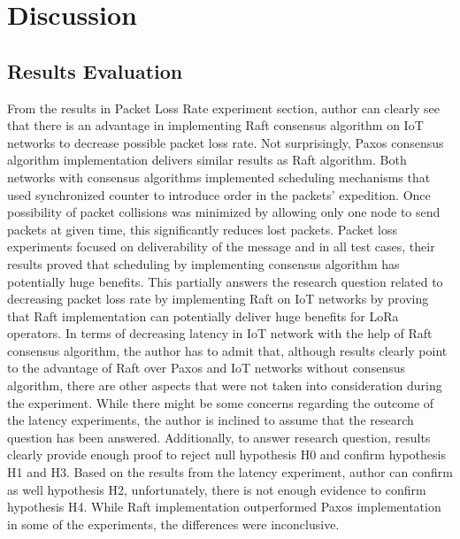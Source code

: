 \documentclass[oneside,12pt]{book}
\begin{document}
\section{Discussion}
\subsection{Results Evaluation}
From the results in Packet Loss Rate experiment section, author can clearly see that there is an advantage in implementing Raft consensus algorithm on IoT networks to decrease possible packet loss rate. Not surprisingly, Paxos consensus algorithm implementation delivers similar results as Raft algorithm. Both networks with consensus algorithms implemented scheduling mechanisms that used synchronized counter to introduce order in the packets’ expedition. Once possibility of packet collisions was minimized by allowing only one node to send packets at given time, this significantly reduces lost packets. Packet loss experiments focused on deliverability of the message and in all test cases, their results proved that scheduling by implementing consensus algorithm has potentially huge benefits. This partially answers the research question related to decreasing packet loss rate by implementing Raft on IoT networks by proving that Raft implementation can potentially deliver huge benefits for LoRa operators.\smallskip \newline 
In terms of decreasing latency in IoT network with the help of Raft consensus algorithm, the author has to admit that, although results clearly point to the advantage of Raft over Paxos and IoT networks without consensus algorithm, there are other aspects that were not taken into consideration during the experiment. While there might be some concerns regarding the outcome of the latency experiments, the author is inclined to assume that the research question has been answered. 
Additionally, to answer research question, results clearly provide enough proof to reject null hypothesis H0 and confirm hypothesis H1 and H3. Based on the results from the latency experiment, author can confirm as well hypothesis H2, unfortunately, there is not enough evidence to confirm hypothesis H4. While Raft implementation outperformed Paxos implementation in some of the experiments, the differences were inconclusive.
\end{document}
